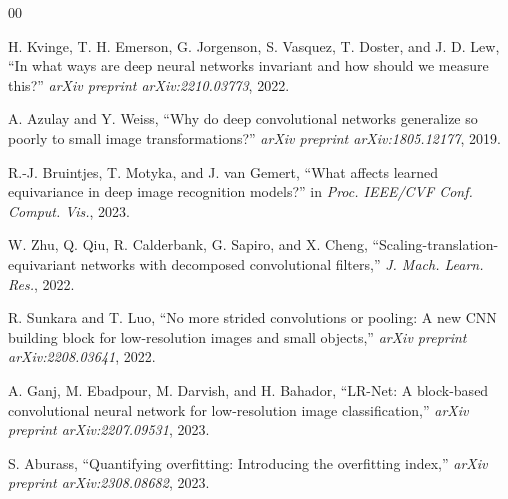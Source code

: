 \documentclass[conference]{IEEEtran}
\begin{document}
\begin{thebibliography}{00}

H. Kvinge, T. H. Emerson, G. Jorgenson, S. Vasquez, T. Doster, and J. D. Lew, ``In what ways are deep neural networks invariant and how should we measure this?'' \textit{arXiv preprint arXiv:2210.03773}, 2022.

A. Azulay and Y. Weiss, ``Why do deep convolutional networks generalize so poorly to small image transformations?'' \textit{arXiv preprint arXiv:1805.12177}, 2019.

R.-J. Bruintjes, T. Motyka, and J. van Gemert, ``What affects learned equivariance in deep image recognition models?'' in \textit{Proc. IEEE/CVF Conf. Comput. Vis.}, 2023.

W. Zhu, Q. Qiu, R. Calderbank, G. Sapiro, and X. Cheng, ``Scaling-translation-equivariant networks with decomposed convolutional filters,'' \textit{J. Mach. Learn. Res.}, 2022.

R. Sunkara and T. Luo, ``No more strided convolutions or pooling: A new CNN building block for low-resolution images and small objects,'' \textit{arXiv preprint arXiv:2208.03641}, 2022.

A. Ganj, M. Ebadpour, M. Darvish, and H. Bahador, ``LR-Net: A block-based convolutional neural network for low-resolution image classification,'' \textit{arXiv preprint arXiv:2207.09531}, 2023.

S. Aburass, ``Quantifying overfitting: Introducing the overfitting index,'' \textit{arXiv preprint arXiv:2308.08682}, 2023.

\end{thebibliography}
\vspace{12pt}
\end{document}
